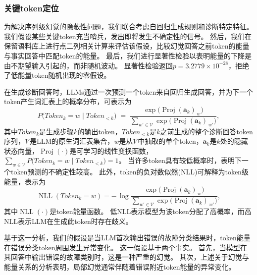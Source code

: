 \documentclass[UTF8,lettersize,journal]{IEEEtran}
\begin{document}
\subsubsection{关键token定位}
为解决序列级幻觉的隐蔽性问题，我们联合考虑自回归生成规则和诊断特定特征。
我们假设某些关键token充当哨兵，发出即将发生不确定性的信号。
然后，我们在保留语料库上进行点二列相关计算来评估该假设，比较幻觉回答之前token的能量与事实回答中匹配token的能量。
最后，我们进行显著性检验以表明能量的下降是由不期望输入引起的，而非随机波动。
显著性检验返回$p=3.2779\times10^{-28}$，拒绝了低能量token随机出现的零假设。

在生成诊断回答时，LLMs通过一次预测一个token来自回归生成回答，并为下一个token产生词汇表上的概率分布，可表示为
\begin{equation}
	P\bigl(\mathit{Token}_{k} = w \;\big|\; \mathit{Token}_{<k}\bigr)
	\;=\;
	\frac{\exp\bigl(\operatorname{Proj}(\bm{a}_{k})_{\,w}\bigr)}
	{\displaystyle \sum_{w' \in \mathcal{V}} 
		\exp\bigl(\operatorname{Proj}(\bm{a}_{k})_{\,w'}\bigr)},
\end{equation}
其中$\mathit{Token}_{k}$是生成步骤$k$的输出token，$\mathit{Token}_{<k}$是$k$之前生成的整个诊断回答token序列，$\mathcal{V}$是LLM的原生词汇表集合，$w$是从$\mathcal{V}$中抽取的单个token，$\bm{a}_{k}$是$k$处的隐藏状态向量，$\operatorname{Proj}(\cdot)$是可学习的线性变换函数，$\sum_{w\in \mathcal{V}} P\bigl(\mathit{Token}_{k} = w \mid \mathit{Token}_{<k}\bigr) = 1$。
当许多token具有较低概率时，表明下一个token预测的不确定性较高。
此外，token的负对数似然(NLL)可解释为token级能量，表示为
\begin{equation}
	\operatorname{NLL}{(\mathit{Token}_{k}=w)}
	=
	-\,\log
	\frac{\exp\bigl(\operatorname{Proj}(\bm{a}_{k})_{\,w}\bigr)}
	{\displaystyle\sum_{w' \in \mathcal{V}}
		\exp\bigl(\operatorname{Proj}(\bm{a}_{k})_{\,w'}\bigr)},
\end{equation}
其中$\operatorname{NLL}{(\cdot)}$是token能量函数。
低NLL表示模型为该token分配了高概率，而高NLL表示LLM在生成此token时存在歧义。

基于这一分析，我们的假设是当LLM首次输出错误的故障分类结果时，token能量在错误分类token周围发生异常变化。
这一假设基于两个事实。
首先，当模型在其回答中输出错误的故障类别时，这是一种严重的幻觉。
其次，上述关于幻觉与能量关系的分析表明，局部幻觉通常伴随着错误附近token能量的异常变化。
\end{document}
